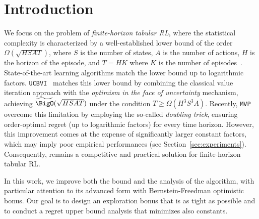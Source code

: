\section{Introduction}
\label{sec:intro}

We focus on the problem of \emph{finite-horizon tabular RL}, where the statistical complexity is characterized by a well-established lower bound of the order $\Omega ( \sqrt{HSAT} )$, where $S$ is the number of states, $A$ is the number of actions, $H$ is the horizon of the episode, and $T=HK$ where $K$ is the number of episodes~\citep{domingues2021episodic}. State-of-the-art learning algorithms match the lower bound up to logarithmic factors. \texttt{UCBVI}~\citep{azar2017minimax} matches this lower bound by combining the classical value iteration approach with the \emph{optimism in the face of uncertainty} mechanism, achieving $\widetilde{\BigO}(\sqrt{HSAT})$ under the condition $T \ge \Omega (H^3 S^3 A)$. Recently, \texttt{MVP}~\citep{zhang2024settling} overcome this limitation by employing the so-called \emph{doubling trick}, ensuring order-optimal regret (up to logarithmic factors) for every time horizon. However, this improvement comes at the expense of significantly larger constant factors, which may imply poor empirical performances (see Section~\ref{sec:experiments}). Consequently, \ucbvi remains a competitive and practical solution for finite-horizon tabular RL.

In this work, we improve both the bound and the analysis of the \ucbvi algorithm, with particular attention to its advanced form with Bernstein-Freedman optimistic bonus. Our goal is to design an exploration bonus that is as tight as possible and to conduct a regret upper bound analysis that minimizes also constants. 